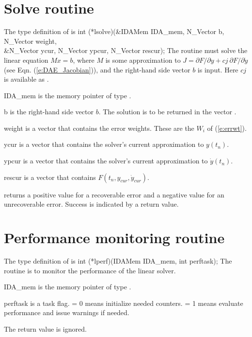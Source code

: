 \section{Solve routine}
The type definition of  is
{
  int (*lsolve)(&IDAMem IDA\_mem, N\_Vector b, N\_Vector weight, \\
                &N\_Vector ycur, N\_Vector ypcur, N\_Vector rescur);  
}
{
  The routine  must solve the linear equation $M x = b$, where         
  $M$ is some approximation to
  $J = \partial F / \partial y + cj ~ \partial F / \partial \dot{y}$  
  (see Eqn. (\ref{e:DAE_Jacobian})), and the right-hand side vector $b$ is input. 
  Here $cj$ is available as .
}
{
  \begin{args}
  \item[IDA\_mem]
    is the {\ida} memory pointer of type .
  \item[b]
    is the right-hand side vector $b$. The solution is to be    
    returned in the vector .
  \item[weight]
    is a vector that contains the error weights.
    These are the $W_i$ of (\ref{e:errwt}).
  \item[ycur]
    is a vector that contains the solver's current approximation to $y(t_n)$.
  \item[ypcur]
    is a vector that contains the solver's current approximation to $\dot{y}(t_n)$.
  \item[rescur]
    is a vector that contains $F(t_n,y_{cur},\dot{y}_{cur})$. 
  \end{args}
}
{
   returns a positive value    
  for a recoverable error and a negative value for an             
  unrecoverable error. Success is indicated by a  return value.
}
{}


\section{Performance monitoring routine}
The type definition of  is
{
  int (*lperf)(IDAMem IDA\_mem, int perftask);
}
{
  The routine  is to monitor the performance of the linear solver.
}
{
  \begin{args}
  \item[IDA\_mem]
    is the {\ida} memory pointer of type .
  \item[perftask]
    is a task flag.   = 0 means initialize needed counters.
     = 1 means evaluate performance and issue warnings if needed.
  \end{args}
}
{
  The  return value is ignored.
}
{}

